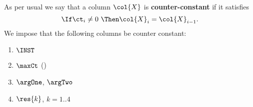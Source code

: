 As per usual we say that a column $\col{X}$ is \textbf{counter-constant} if it satisfies
\[
	\If \ct_{i} \neq 0 ~ \Then \col{X}_{i} = \col{X}_{i - 1}. 
\]
We impose that the following columns be counter constant:
\begin{multicols}{2}
\begin{enumerate}
	\item $\INST$ 
	\item $\maxCt$  \quad (\sanityCheck)  
	\item $\argOne$, $\argTwo$   
	\item $\res{k}$, $k=1..4$
\end{enumerate}
\end{multicols}
